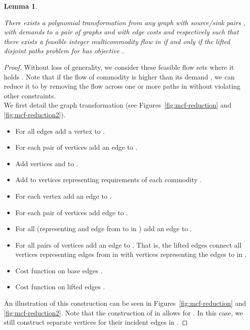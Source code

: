 \documentclass{article}
\newtheorem{lemma}{Lemma}
\begin{document}
\begin{lemma}
\label{lemma:multicommodity-flow-reduction}

There exists a polynomial transformation from any graph  with source/sink pairs ,  with demands  to
a pair of graphs  and  with edge costs  and  respectively such that
there exists a feasible integer multicommodity flow in  if and only if the lifted disjoint paths problem for  has objective
.
\end{lemma}

\begin{proof}
Without loss of generality, we consider these feasible flow sets  where it holds  . Note that if the flow of commodity  is higher than its demand , we can reduce it to  by removing the flow across one or more paths in  without violating other constraints.\\
We first detail the graph transformation (see Figures~\ref{fig:mcf-reduction} and \ref{fig:mcf-reduction2}).
\begin{itemize}
 \item For all edges  add a vertex  to .
 \item For each pair of vertices   add an edge  to .
 \item Add vertices  and  to .
 \item Add to  vertices  representing requirements of each commodity .
 \item For each vertex  add an edge  to .
 \item For each pair of vertices  add edge  to .
 \item For all  (representing and edge from  to  in ) add an edge  to .
 \item For all pairs of vertices   add an edge  to . That is, the lifted edges connect all vertices representing edges from  in  with vertices representing the edges to  in .
 \item Cost function on base edges   . 
 \item Cost function on lifted edges  .
\end{itemize}
An illustration of this construction can be seen in Figures~\ref{fig:mcf-reduction} and \ref{fig:mcf-reduction2}.
Note that the construction of  in \cite{EvenMulti} allows  for .
In this case, we still construct separate vertices for their incident edges in .





\end{proof}
\end{document}
